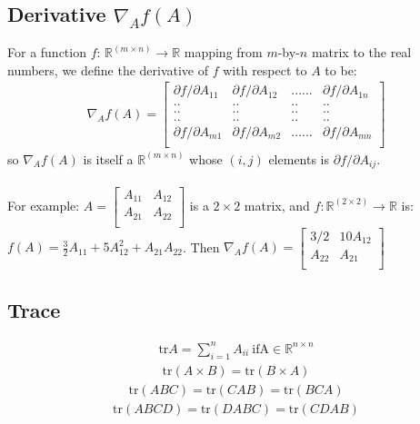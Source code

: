 \documentclass[a4paper,12pt]{report}
\begin{document}
\begin{appendices}
\subsection{Derivative $\nabla_A f(A)$}
For a function $f$: $\mathbb{R} ^ {(m \times n)} \rightarrow  \mathbb{R}$ mapping from $m$-by-$n$ matrix to the real numbers, we define the derivative of $f$ with respect to $A$ to be:
\begin{align*}
		\nabla_A f(A) = \begin{bmatrix} \partial f/ \partial A_{11} & \partial f/ \partial A_{12} & ......&\partial f/ \partial A_{1n} \\
		                                 .. & .. & .. & .. \\
																		 .. & .. & .. & .. \\
																		 .. & .. & .. & .. \\
		                                \partial f/ \partial A_{m1} & \partial f/ \partial A_{m2} & ......&\partial f/ \partial A_{mn} \\
		\end{bmatrix}
\end{align*}
so $\nabla_A f(A)$ is itself a $\mathbb{R}^{(m \times n)}$ whose $(i,j)$ elements is $\partial f / \partial A_{ij}$. \\
\\
For example: $A = \left[ \begin{smallmatrix} A_{11} & A_{12}\\ A_{21} & A_{22} \\ \end{smallmatrix} \right]$ is a $2\times2$ matrix, and $f: \mathbb{R}^{(2 \times 2)} \rightarrow \mathbb{R} $ is: $f(A)= \frac{3}{2} A_{11} + 5A_{12}^2 + A_{21}A_{22}$. Then $\nabla_A f(A) = \left[ \begin{smallmatrix} 3/2 & 10 A_{12}\\ A_{22} & A_{21} \\ \end{smallmatrix} \right]$

\subsection{Trace}
\begin{align*}
		\mathrm{tr} A = \sum_{i=1} ^n A_{ii} \mathrm{  \ if A} \in \mathbb{R}^{n \times n}
\end{align*}
\begin{align*}
		\mathrm{tr} (A \times B) = \mathrm{tr} (B \times A) 
\end{align*}
\begin{align*}
		\mathrm{tr} (A B C) = \mathrm{tr} (C A B) = \mathrm{tr} (B C A)
\end{align*}
\begin{align*}
		\mathrm{tr} (A B C D) = \mathrm{tr} (D A B C) = \mathrm{tr} ( C D A B )
\end{align*}


\end{appendices}
\end{document}
